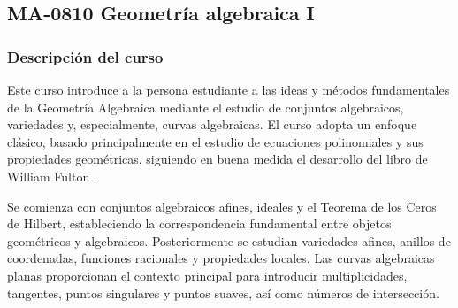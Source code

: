 \newpage
\subsection*{MA-0810 Geometría algebraica I}

\hypertarget{MA0810}{}
\begin{refsection}
\begin{table}[H]
\end{table}

\subsubsection*{Descripción del curso}

Este curso introduce a la persona estudiante a las ideas y métodos fundamentales de la Geometría Algebraica mediante el estudio de conjuntos algebraicos, variedades y, especialmente, curvas algebraicas. El curso adopta un enfoque clásico, basado principalmente en el estudio de ecuaciones polinomiales y sus propiedades geométricas, siguiendo en buena medida el desarrollo del libro de William Fulton \cite{Ful89}.

Se comienza con conjuntos algebraicos afines, ideales y el Teorema de los Ceros de Hilbert, estableciendo la correspondencia fundamental entre objetos geométricos y algebraicos. Posteriormente se estudian variedades afines, anillos de coordenadas, funciones racionales y propiedades locales. Las curvas algebraicas planas proporcionan el contexto principal para introducir multiplicidades, tangentes, puntos singulares y puntos suaves, así como números de intersección.


\end{refsection}
